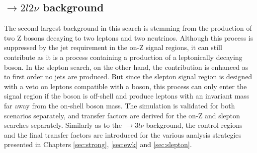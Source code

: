 \subsection*{\PZZ$\rightarrow 2l2\nu$ background}\label{ZZ}
\noindent
\justify
The second largest background in this search is stemming from the production of two Z bosons decaying to two leptons and two neutrinos. 
Although this process is suppressed by the jet requirement in the on-Z signal regions, it can still contribute as it is a process containing a production of a leptonically decaying \PZ boson. 
In the slepton search, on the other hand, the contribution is enhanced as to first order no jets are produced. 
But since the slepton signal region is designed with a veto on leptons compatible with a \PZ boson, this process can only enter the signal region if the \PZ boson is off-shell and produce leptons with an invariant mass far away from the on-shell \PZ boson mass. 
The simulation is validated for both scenarios separately, and transfer factors are derived for the on-Z and slepton searches separately. 
Similarly as to the \PWZ$\rightarrow3l\nu$ background, the control regions and the final transfer factors are introduced for the various analysis strategies presented in Chapters \ref{sec:strong}, \ref{sec:ewk} and \ref{sec:slepton}. 
